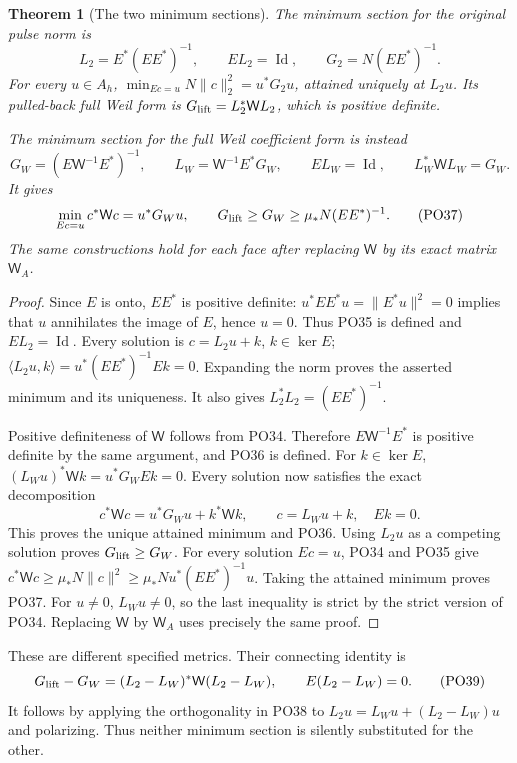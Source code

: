 \documentclass[11pt,a4paper]{article}
\newtheorem{theorem}{Theorem}[section]
\theoremstyle{definition}\newtheorem{definition}[theorem]{Definition}
\begin{document}
\begin{theorem}[The two minimum sections]\label{PO:thm:minima}
The minimum section for the original pulse norm is
\[
 L_2=E^*(EE^*)^{-1},\qquad
 EL_2=\operatorname{Id},\qquad
 G_2=N(EE^*)^{-1}.
 \tag{PO35}\label{PO:po:L2}
\]
For every \(u\in A_h\),
\(\min_{Ec=u}N\|c\|_2^2=u^*G_2u\), attained uniquely at \(L_2u\).
Its pulled-back full Weil form is
\(G_{\rm lift}=L_2^*\mathsf W L_2\), which is positive definite.

The minimum section for the full Weil coefficient form is instead
\[
 G_W=(E\mathsf W^{-1}E^*)^{-1},\qquad
 L_W=\mathsf W^{-1}E^*G_W,\qquad
 EL_W=\operatorname{Id},\qquad L_W^*\mathsf W L_W=G_W .
 \tag{PO36}\label{PO:po:LW}
\]
It gives
\[
 \min_{Ec=u}c^*\mathsf Wc=u^*G_Wu,\qquad
 G_{\rm lift}\ge G_W\ge\mu_*N(EE^*)^{-1}.
 \tag{PO37}\label{PO:po:metrics}
\]
The same constructions hold for each face after replacing
\(\mathsf W\) by its exact matrix \(\mathsf W_A\).
\end{theorem}
\begin{proof}
Since \(E\) is onto, \(EE^*\) is positive definite:
\(u^*EE^*u=\|E^*u\|^2=0\) implies that \(u\) annihilates
the image of \(E\), hence \(u=0\).
Thus PO35 is defined and \(EL_2=\operatorname{Id}\).
Every solution is \(c=L_2u+k\), \(k\in\ker E\);
\(\langle L_2u,k\rangle=u^*(EE^*)^{-1}Ek=0\).
Expanding the norm proves the asserted minimum and its uniqueness.
It also gives \(L_2^*L_2=(EE^*)^{-1}\).

Positive definiteness of \(\mathsf W\) follows from PO34.
Therefore \(E\mathsf W^{-1}E^*\) is positive definite by
the same argument, and PO36 is defined.
For \(k\in\ker E\),
\((L_Wu)^*\mathsf Wk=u^*G_WEk=0\).
Every solution now satisfies the exact decomposition
\[
 c^*\mathsf Wc
   =u^*G_Wu+k^*\mathsf Wk,\qquad c=L_Wu+k,\quad Ek=0.
 \tag{PO38}\label{PO:po:minimum-decomp}
\]
This proves the unique attained minimum and PO36.
Using \(L_2u\) as a competing solution proves
\(G_{\rm lift}\ge G_W\). For every solution \(Ec=u\),
PO34 and PO35 give
\(c^*\mathsf Wc\ge\mu_*N\|c\|^2
\ge\mu_*N u^*(EE^*)^{-1}u\).
Taking the attained minimum proves PO37.
For \(u\ne0\), \(L_Wu\ne0\), so the last inequality is
strict by the strict version of PO34.
Replacing \(\mathsf W\) by \(\mathsf W_A\) uses precisely
the same proof.
\end{proof}

These are different specified metrics. Their connecting identity is
\[
 G_{\rm lift}-G_W
  =(L_2-L_W)^*\mathsf W(L_2-L_W),\qquad
 E(L_2-L_W)=0 .
 \tag{PO39}\label{PO:po:metric-difference}
\]
It follows by applying the orthogonality in PO38 to
\(L_2u=L_Wu+(L_2-L_W)u\) and polarizing.
Thus neither minimum section is silently substituted for the other.
\end{document}
